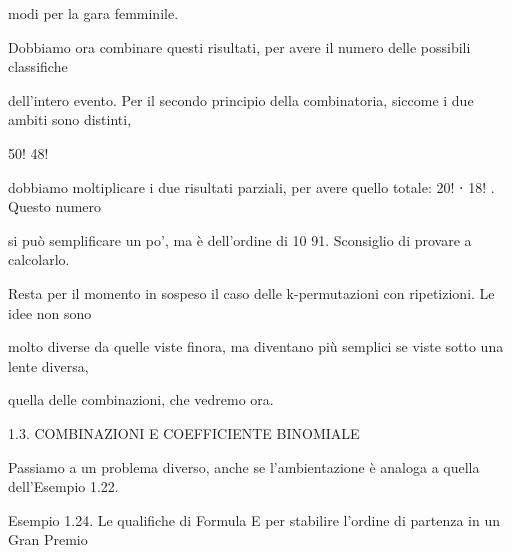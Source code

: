 \documentclass[a4paper,portrait,12pt]{article}
\begin{document}
\begin{flushleft}
modi per la gara femminile.
\end{flushleft}


\begin{flushleft}
Dobbiamo ora combinare questi risultati, per avere il numero delle possibili classifiche
\end{flushleft}


\begin{flushleft}
dell'intero evento. Per il secondo principio della combinatoria, siccome i due ambiti sono distinti,
\end{flushleft}


50! 48!


\begin{flushleft}
dobbiamo moltiplicare i due risultati parziali, per avere quello totale: 20! ⋅ 18! . Questo numero
\end{flushleft}


\begin{flushleft}
si pu\`{o} semplificare un po', ma \`{e} dell'ordine di 10 91. Sconsiglio di provare a calcolarlo.
\end{flushleft}


\begin{flushleft}
Resta per il momento in sospeso il caso delle k-permutazioni con ripetizioni. Le idee non sono
\end{flushleft}


\begin{flushleft}
molto diverse da quelle viste finora, ma diventano più semplici se viste sotto una lente diversa,
\end{flushleft}


\begin{flushleft}
quella delle combinazioni, che vedremo ora.
\end{flushleft}





\begin{flushleft}
1.3. COMBINAZIONI E COEFFICIENTE BINOMIALE
\end{flushleft}


\begin{flushleft}
Passiamo a un problema diverso, anche se l'ambientazione \`{e} analoga a quella dell'Esempio 1.22.
\end{flushleft}


\begin{flushleft}
Esempio 1.24. Le qualifiche di Formula E per stabilire l'ordine di partenza in un Gran Premio
\end{flushleft}
\end{document}

